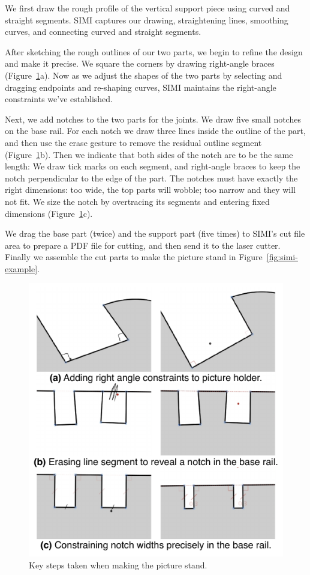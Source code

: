 We first draw the rough profile of the vertical support piece using
curved and straight segments. SIMI captures our drawing, straightening
lines, smoothing curves, and connecting curved and straight segments.
 
After sketching the rough outlines of our two parts, we begin to
refine the design and make it precise.  We square the corners by
drawing right-angle braces (Figure~\ref{fig:motivating}a).  Now as we
adjust the shapes of the two parts by selecting and dragging endpoints
and re-shaping curves, SIMI maintains the right-angle constraints
we've established.
 
Next, we add notches to the two parts for the joints. We draw five
small notches on the base rail. For each notch we draw three lines
inside the outline of the part, and then use the erase gesture to
remove the residual outline segment (Figure~\ref{fig:motivating}b).
Then we indicate that both sides of the notch are to be the same
length: We draw tick marks on each segment, and right-angle braces to
keep the notch perpendicular to the edge of the part. The notches must
have exactly the right dimensions: too wide, the top parts will
wobble; too narrow and they will not fit. We size the notch by
overtracing its segments and entering fixed dimensions
(Figure~\ref{fig:motivating}c).
 
We drag the base part (twice) and the support part (five times) to
SIMI's cut file area to prepare a PDF file for cutting, and then send
it to the laser cutter.  Finally we assemble the cut parts to make the
picture stand in Figure~\ref{fig:simi-example}.

\begin{figure}[h]
  \centering
  \includegraphics{img/motivating-example.pdf}
  \caption{Key steps taken when making the picture stand.}
  \label{fig:motivating}
\end{figure}


